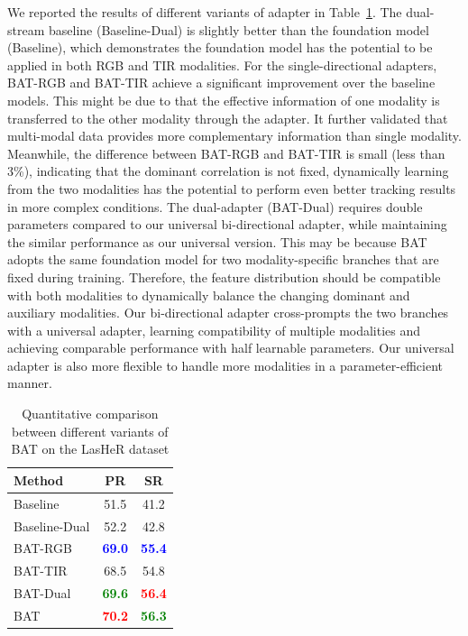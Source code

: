 \documentclass[letterpaper]{article} %
\begin{document}
We reported the results of different variants of adapter in Table~\ref{tab:adaptertype}.
The dual-stream baseline (Baseline-Dual) is slightly better than the foundation model (Baseline), which demonstrates the foundation model has the potential to be applied in both RGB and TIR modalities.
For the single-directional adapters, BAT-RGB and BAT-TIR achieve a significant improvement over the baseline models. This might be due to that the effective information of one modality is transferred to the other modality through the adapter. It further validated that multi-modal data provides more complementary information than single modality. Meanwhile, the difference between BAT-RGB and BAT-TIR is small (less than 3\%), indicating that the dominant correlation is not fixed, dynamically learning from the two modalities has the potential to perform even better tracking results in more complex conditions.
The dual-adapter (BAT-Dual) requires double parameters compared to our universal bi-directional adapter, while maintaining the similar performance as our universal version. This may be because BAT adopts the same foundation model for two modality-specific branches that are fixed during training. Therefore, the feature distribution should be compatible with both modalities to dynamically balance the changing dominant and auxiliary modalities.
Our bi-directional adapter cross-prompts the two branches with a universal adapter, learning compatibility of multiple modalities and achieving comparable performance with half learnable parameters. Our universal adapter is also more flexible to handle more modalities in a parameter-efficient manner.


\begin{table}[t]
    \centering
    \setlength{\tabcolsep}{12pt}
    \caption{Quantitative comparison between different variants of BAT on the LasHeR dataset}
    \begin{tabular}{lcc}
        \toprule
        Method        & PR& SR  \\
        \midrule
        Baseline     &   51.5  & 41.2\\
        Baseline-Dual    & 52.2   & 42.8   \\
        BAT-RGB & \textbf{\textcolor{blue}{69.0}}  & \textbf{\textcolor{blue}{55.4}}   \\
        BAT-TIR&   68.5 & 54.8 \\
        BAT-Dual & \textbf{\textcolor{green}{69.6}} & \textbf{\textcolor{red}{56.4}}   \\
        \midrule
        BAT          &   \textbf{\textcolor{red}{70.2}} &\textbf{\textcolor{green}{56.3}} \\
        \bottomrule
    \end{tabular}
    \label{tab:adaptertype}
\end{table}
\end{document}
